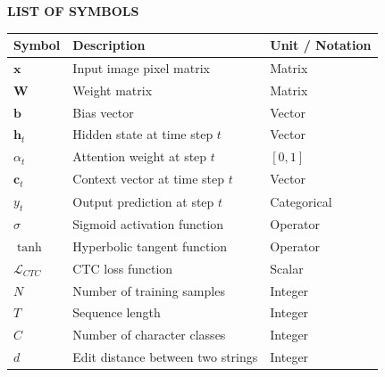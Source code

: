 \newpage

\begin{center}
    \Large{\textbf{LIST OF SYMBOLS}} \\
    \vspace{1.0cm}
\end{center}
\begin{longtable}{lll}
    \textbf{Symbol} & \textbf{Description} & \textbf{Unit / Notation} \\
    \midrule
    $\mathbf{x}$ & Input image pixel matrix & Matrix \\
    $\mathbf{W}$ & Weight matrix & Matrix \\
    $\mathbf{b}$ & Bias vector & Vector \\
    $\mathbf{h}_t$ & Hidden state at time step $t$ & Vector \\
    $\alpha_t$ & Attention weight at step $t$ & $[0, 1]$ \\
    $\mathbf{c}_t$ & Context vector at time step $t$ & Vector \\
    $y_t$ & Output prediction at step $t$ & Categorical \\
    $\sigma$ & Sigmoid activation function & Operator \\
    $\tanh$ & Hyperbolic tangent function & Operator \\
    $\mathcal{L}_{CTC}$ & CTC loss function & Scalar \\
    $N$ & Number of training samples & Integer \\
    $T$ & Sequence length & Integer \\
    $C$ & Number of character classes & Integer \\
    $d$ & Edit distance between two strings & Integer \\
\end{longtable}

\newpage

\tableofcontents
\newpage
{}
\listoffigures
\newpage
{}
\listoftables
\newpage

